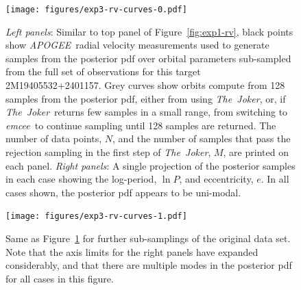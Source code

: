\documentclass[manuscript, letterpaper]{aastex6}
\newcommand{\project}[1]{\textsl{#1}}
\newcommand{\acronym}[1]{{\small{#1}}}
\newcommand{\apogee}{\project{\acronym{APOGEE}}}
\newcommand{\samplername}{\project{The~Joker}}
\newcommand{\emcee}{\project{emcee}}
\newcommand{\figname}{Figure}
\newcommand{\todoapw}[1]{{\color{red}APW TODO: #1}}
\begin{document}
\begin{figure}[p]
\begin{center}
\texttt{[image: figures/exp3-rv-curves-0.pdf]}
\end{center}
\caption{%
{\sl Left panels}: Similar to top panel of \figname~\ref{fig:exp1-rv}, black
points show \apogee\ radial velocity measurements used to generate samples from
the posterior pdf over orbital parameters sub-sampled from the full set of
observations for this target 2M19405532+2401157.
Grey curves show orbits compute from 128 samples from the posterior pdf, either
from using \samplername, or, if \samplername\ returns few samples in a small
range, from switching to \emcee\ to continue sampling until 128 samples are
returned.
The number of data points, $N$, and the number of samples that pass the
rejection sampling in the first step of \samplername, $M$, are printed on each
panel.
{\sl Right panels}: A single projection of the posterior samples in each case
showing the log-period, $\ln P$, and eccentricity, $e$.
In all cases shown, the posterior pdf appears to be uni-modal.
\label{fig:exp3-rv-0}}
\end{figure}

\begin{figure}[p]
\begin{center}
\texttt{[image: figures/exp3-rv-curves-1.pdf]}
\end{center}
\caption{%
Same as \figname~\ref{fig:exp3-rv-0} for further sub-samplings of the original
data set.
Note that the axis limits for the right panels have expanded considerably, and
that there are multiple modes in the posterior pdf for all cases in this figure.
\label{fig:exp3-rv-1}}
\end{figure}


\end{document}
